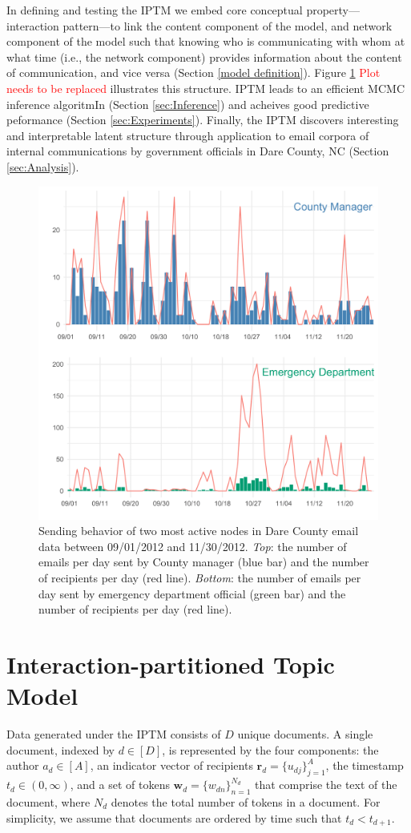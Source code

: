 \documentclass{article}
\begin{document}
In defining and testing the IPTM we embed core conceptual property---interaction pattern---to link the content component of the model, and network component of the model such that knowing who is communicating with whom at what time (i.e., the network component) provides information about the content of communication, and vice versa (Section \ref{model definition}). Figure \ref{fig:EDAplot} \textcolor{red}{Plot needs to be replaced} illustrates this structure. IPTM leads to an efficient MCMC inference algoritmIn (Section \ref{sec:Inference}) and acheives good predictive peformance (Section \ref{sec:Experiments}). Finally, the IPTM discovers interesting and interpretable latent structure through application to email corpora of internal communications by government officials in Dare County, NC (Section \ref{sec:Analysis}). 
\begin{figure}[t]
	\centering
	\includegraphics[width=.48\textwidth]{plots/EDAplot.png}  
	\caption{Sending behavior of two most active nodes in Dare County email data between 09/01/2012 and 11/30/2012. \textit{Top}: the number of emails per day sent by County manager (blue bar) and the number of recipients per day (red line). \textit{Bottom}: the number of emails per day sent by emergency department official (green bar) and the number of recipients per day (red line).}
\label{fig:EDAplot}
\end{figure}
\section{Interaction-partitioned Topic Model}\label{sec:model definition}

Data generated under the IPTM consists of $D$ unique documents. A single document, indexed by $d \in [D]$, is represented by the four components: the author $a_d \in [A]$, an indicator vector of recipients $\boldsymbol{r}_d = \{u_{dj} \}_{j=1}^{A}$, the timestamp $t_d \in (0, \infty)$, and a set of tokens $\boldsymbol{w}_d= \{w_{dn} \}_{n=1}^{N_d}$ that comprise the text of the document, where $N_d$ denotes the total number of tokens in a document. For simplicity, we assume that documents are ordered by time such that $t_d < t_{d+1}$.
\end{document}
